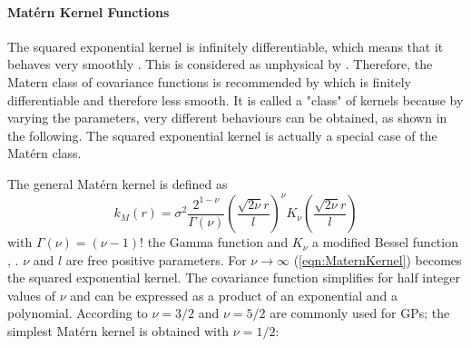 \documentclass[%
  a4paper,oneside,%
  11pt,%
  smallchapters,
  style=printdev,
  extramargin,
  green,%
  rgb, <cmyk>
  ]{tubsbook}
\begin{document}
\paragraph{Mat\'ern Kernel Functions}
The squared exponential kernel is infinitely differentiable, which means that it behaves very smoothly \cite{rasmussen2006}. This is considered as unphysical by \cite{stein1999}. Therefore, the Matern class of covariance functions \cite{matern2013} is recommended by \cite{stein1999} which is finitely differentiable and therefore less smooth. It is called a "class" of kernels because by varying the parameters, very different behaviours can be obtained, as shown in the following. The squared exponential kernel is actually a special case of the Mat\'ern class.

The general Mat\'ern kernel is defined as
\begin{equation}
k_M(r) = \sigma^2 \frac{2^{1-\nu}}{\Gamma(\nu)}  \left( \frac{\sqrt{2\nu}r}{l}  \right)^{\nu} K_{\nu}  \left(  \frac{\sqrt{2\nu}r}{l}   \right)
\label{eqn:MaternKernel}
\end{equation}
with $\Gamma(\nu) = (\nu - 1)!$ the Gamma function and $K_{\nu}$ a modified Bessel function \cite[p.84 ff.]{abramowitz2013}, \cite{rasmussen2006}. $\nu$ and $l$ are free positive parameters.
For $\nu \to \infty$  (\ref{eqn:MaternKernel}) becomes the squared exponential kernel.
The covariance function simplifies for half integer values of $\nu$ and can be expressed as a product of an exponential and a polynomial. According to \cite{rasmussen2006} $\nu = 3/2$ and $\nu = 5/2$ are commonly used for GPs; the simplest Mat\'ern kernel is obtained with $\nu = 1/2$:
\end{document}
